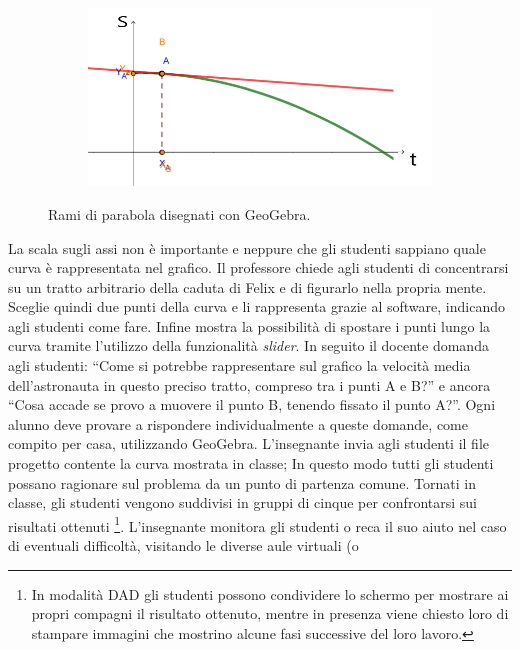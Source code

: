 \documentclass{report} \usepackage[T1]{fontenc} \usepackage[italian]{babel}
\begin{document}
\begin{figure}[H]
\begin{subfigure}[b]{0.49\textwidth}
  \end{subfigure}
  \begin{subfigure}[b]{0.49\textwidth}
  \includegraphics[width=\textwidth]{tg4}
  \end{subfigure}
  \caption{
           Rami di parabola  disegnati con GeoGebra.
          }
  \label{fig:geogebra}
\end{figure}
La scala sugli assi non è importante e neppure che gli studenti sappiano quale
curva è rappresentata nel grafico.
Il professore chiede agli studenti di concentrarsi su un tratto arbitrario della
caduta di Felix e di figurarlo nella propria mente.
Sceglie quindi due punti della curva e li
rappresenta grazie al software, indicando agli studenti come fare. Infine
mostra la possibilità di spostare i punti lungo la curva tramite l’utilizzo
della funzionalità \emph{slider}.
In seguito il docente domanda agli studenti: ``Come si potrebbe
rappresentare sul grafico la velocità media dell’astronauta in questo preciso
tratto, compreso tra i punti A e B?'' e ancora ``Cosa accade se provo a muovere il punto B,
tenendo fissato il punto A?''. Ogni alunno deve provare a rispondere individualmente a queste
domande, come compito per casa,
utilizzando GeoGebra. L’insegnante invia agli studenti il file progetto contente
la curva mostrata in classe; In questo modo tutti gli studenti possano
ragionare sul problema da un punto di partenza comune.
Tornati in classe, gli studenti vengono suddivisi in gruppi di cinque per
confrontarsi sui risultati ottenuti
\footnote{
          In modalità DAD gli studenti possono
          condividere lo schermo per mostrare ai propri compagni il risultato ottenuto,
          mentre in presenza viene chiesto loro di stampare immagini che mostrino alcune
          fasi successive del loro lavoro.
         }.
L’insegnante monitora gli studenti
o reca il suo aiuto nel caso di eventuali difficoltà, visitando le diverse aule virtuali (o
\end{document}
